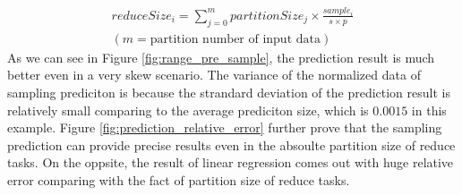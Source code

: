 \documentclass[10pt,twocolumn]{article}
\begin{document}
\begin{equation} 
\begin{aligned}
	reduceSize_i = {\displaystyle\sum_{j=0}^{m} {partitionSize_j \times \frac{sample_i}{s \times p}}} \\ 
	{\left( m = \text{partition number of input data} \right)}
\end{aligned}
\end{equation}
As we can see in Figure \ref{fig:range_pre_sample}, the prediction result is much better even in a very skew scenario. The variance of the normalized data of sampling prediciton is because the strandard deviation of the prediction result is relatively small comparing to the average prediciton size, which is $0.0015$ in this example. Figure \ref{fig:prediction_relative_error} further prove that the sampling prediction can provide precise results even in the absoulte partition size of reduce tasks. On the oppsite, the result of linear regression comes out with huge relative error comparing with the fact of partition size of reduce tasks.
\end{document}
